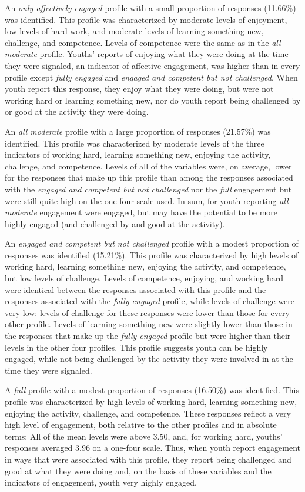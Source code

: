 \documentclass[]{book}
\theoremstyle{definition}
\theoremstyle{definition}
\theoremstyle{definition}
\theoremstyle{remark}
\begin{document}
An \emph{only affectively engaged} profile with a small proportion of
responses (11.66\%) was identified. This profile was characterized by
moderate levels of enjoyment, low levels of hard work, and moderate
levels of learning something new, challenge, and competence. Levels of
competence were the same as in the \emph{all moderate} profile. Youths'
reports of enjoying what they were doing at the time they were signaled,
an indicator of affective engagement, was higher than in every profile
except \emph{fully engaged} and \emph{engaged and competent but not
challenged}. When youth report this response, they enjoy what they were
doing, but were not working hard or learning something new, nor do youth
report being challenged by or good at the activity they were doing.

An \emph{all moderate} profile with a large proportion of responses
(21.57\%) was identified. This profile was characterized by moderate
levels of the three indicators of working hard, learning something new,
enjoying the activity, challenge, and competence. Levels of all of the
variables were, on average, lower for the responses that make up this
profile than among the responses associated with the \emph{engaged and
competent but not challenged} nor the \emph{full} engagement but were
still quite high on the one-four scale used. In sum, for youth reporting
\emph{all moderate} engagement were engaged, but may have the potential
to be more highly engaged (and challenged by and good at the activity).

An \emph{engaged and competent but not challenged} profile with a modest
proportion of responses was identified (15.21\%). This profile was
characterized by high levels of working hard, learning something new,
enjoying the activity, and competence, but low levels of challenge.
Levels of competence, enjoying, and working hard were identical between
the responses associated with this profile and the responses associated
with the \emph{fully engaged} profile, while levels of challenge were
very low: levels of challenge for these responses were lower than those
for every other profile. Levels of learning something new were slightly
lower than those in the responses that make up the \emph{fully engaged}
profile but were higher than their levels in the other four profiles.
This profile suggests youth can be highly engaged, while not being
challenged by the activity they were involved in at the time they were
signaled.

A \emph{full} profile with a modest proportion of responses (16.50\%)
was identified. This profile was characterized by high levels of working
hard, learning something new, enjoying the activity, challenge, and
competence. These responses reflect a very high level of engagement,
both relative to the other profiles and in absolute terms: All of the
mean levels were above 3.50, and, for working hard, youths' responses
averaged 3.96 on a one-four scale. Thus, when youth report engagement in
ways that were associated with this profile, they report being
challenged and good at what they were doing and, on the basis of these
variables and the indicators of engagement, youth very highly engaged.
\end{document}
